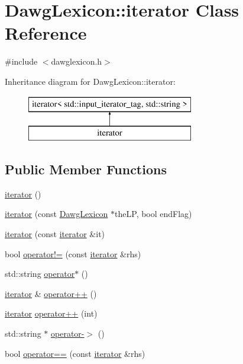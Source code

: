 \hypertarget{classDawgLexicon_1_1iterator}{}\section{Dawg\+Lexicon\+:\+:iterator Class Reference}
\label{classDawgLexicon_1_1iterator}


{\ttfamily \#include $<$dawglexicon.\+h$>$}

Inheritance diagram for Dawg\+Lexicon\+:\+:iterator\+:\begin{figure}[H]
\begin{center}
\leavevmode
\includegraphics[height=2.000000cm]{classDawgLexicon_1_1iterator}
\end{center}
\end{figure}
\subsection*{Public Member Functions}
\begin{DoxyCompactItemize}
\item 
\mbox{\hyperlink{classDawgLexicon_1_1iterator_a67d652c2433cf9217ed2a1485092fdd1}{iterator}} ()
\item 
\mbox{\hyperlink{classDawgLexicon_1_1iterator_a914aea962a8d01c41cdd8926ce837256}{iterator}} (const \mbox{\hyperlink{classDawgLexicon}{Dawg\+Lexicon}} $\ast$the\+LP, bool end\+Flag)
\item 
\mbox{\hyperlink{classDawgLexicon_1_1iterator_a698b7553261e7209d6c29fb55627dce4}{iterator}} (const \mbox{\hyperlink{classDawgLexicon_1_1iterator}{iterator}} \&it)
\item 
bool \mbox{\hyperlink{classDawgLexicon_1_1iterator_ae1983f2cb0df1f0cbe77ac29590e2e2b}{operator!=}} (const \mbox{\hyperlink{classDawgLexicon_1_1iterator}{iterator}} \&rhs)
\item 
std\+::string \mbox{\hyperlink{classDawgLexicon_1_1iterator_aa3864db3883c7a53277427a06ed3e017}{operator$\ast$}} ()
\item 
\mbox{\hyperlink{classDawgLexicon_1_1iterator}{iterator}} \& \mbox{\hyperlink{classDawgLexicon_1_1iterator_af1b1c7856a59f34c7d3570f946a2ff00}{operator++}} ()
\item 
\mbox{\hyperlink{classDawgLexicon_1_1iterator}{iterator}} \mbox{\hyperlink{classDawgLexicon_1_1iterator_a538d230f8b52d2bc0950e26ce74ec239}{operator++}} (int)
\item 
std\+::string $\ast$ \mbox{\hyperlink{classDawgLexicon_1_1iterator_a67990a1056b32b659082cbb0bc6ab34a}{operator-\/$>$}} ()
\item 
bool \mbox{\hyperlink{classDawgLexicon_1_1iterator_a798956e7a65ef16c891d129b3ced0f9e}{operator==}} (const \mbox{\hyperlink{classDawgLexicon_1_1iterator}{iterator}} \&rhs)
\end{DoxyCompactItemize}



